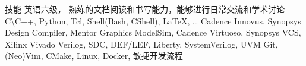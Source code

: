 
\begin{rubric}{技能}
	\entry*[语言能力]
	英语六级， 熟练的文档阅读和书写能力，能够进行日常交流和学术讨论
	C\textbackslash C++, Python, Tcl, Shell(Bash, CShell), \LaTeX, \ldots
	Cadence Innovus, Synopsys Design Compiler, Mentor Graphics ModelSim, Cadence Virtuoso, Synopsys VCS, Xilinx Vivado
	\entry*[设计语言]
	Verilog, SDC, DEF/LEF, Liberty, SystemVerilog, UVM
	\entry*[Misc.]
	Git, (Neo)Vim, CMake, Linux, Docker, 敏捷开发流程
\end{rubric}
